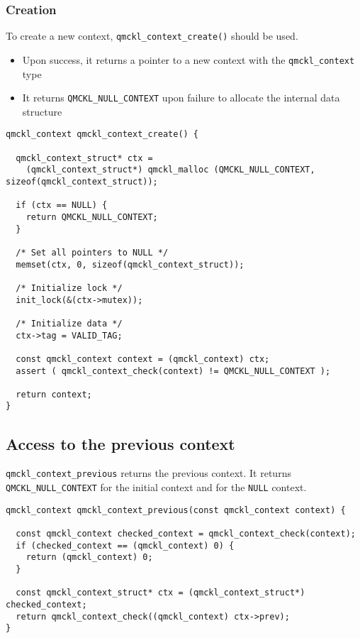 \subsubsection{Creation}
\label{sec:orgd8b711a}

To create a new context, \texttt{qmckl\_context\_create()} should be used.
\begin{itemize}
\item Upon success, it returns a pointer to a new context with the \texttt{qmckl\_context} type
\item It returns \texttt{QMCKL\_NULL\_CONTEXT} upon failure to allocate the internal data structure
\end{itemize}

\begin{verbatim}
qmckl_context qmckl_context_create() {

  qmckl_context_struct* ctx =
    (qmckl_context_struct*) qmckl_malloc (QMCKL_NULL_CONTEXT, sizeof(qmckl_context_struct));

  if (ctx == NULL) {
    return QMCKL_NULL_CONTEXT;
  }

  /* Set all pointers to NULL */
  memset(ctx, 0, sizeof(qmckl_context_struct));

  /* Initialize lock */
  init_lock(&(ctx->mutex));

  /* Initialize data */
  ctx->tag = VALID_TAG;

  const qmckl_context context = (qmckl_context) ctx;
  assert ( qmckl_context_check(context) != QMCKL_NULL_CONTEXT );

  return context;
}
\end{verbatim}
\subsection{Access to the previous context}
\label{sec:org80592fe}

\texttt{qmckl\_context\_previous} returns the previous context. It returns
\texttt{QMCKL\_NULL\_CONTEXT} for the initial context and for the \texttt{NULL} context.

\begin{verbatim}
qmckl_context qmckl_context_previous(const qmckl_context context) {

  const qmckl_context checked_context = qmckl_context_check(context);
  if (checked_context == (qmckl_context) 0) {
    return (qmckl_context) 0;
  }

  const qmckl_context_struct* ctx = (qmckl_context_struct*) checked_context;
  return qmckl_context_check((qmckl_context) ctx->prev);
}
\end{verbatim}
